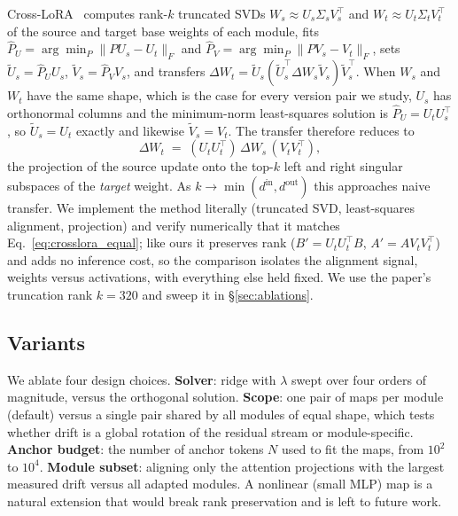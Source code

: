 Cross-LoRA~\citep{xia2025crosslora} computes rank-$k$ truncated SVDs
$W_s\approx U_s\Sigma_sV_s^\top$ and $W_t\approx U_t\Sigma_tV_t^\top$ of the
source and target base weights of each module, fits
$\hat P_U=\arg\min_P\lVert PU_s-U_t\rVert_F$ and
$\hat P_V=\arg\min_P\lVert PV_s-V_t\rVert_F$, sets $\tilde U_s=\hat P_UU_s$,
$\tilde V_s=\hat P_VV_s$, and transfers
$\Delta W_t=\tilde U_s(\tilde U_s^\top\Delta W_s\tilde V_s)\tilde V_s^\top$.
When $W_s$ and $W_t$ have the same shape, which is the case for every version
pair we study, $U_s$ has orthonormal columns and the minimum-norm least-squares
solution is $\hat P_U=U_tU_s^\top$, so $\tilde U_s=U_t$ exactly and likewise
$\tilde V_s=V_t$. The transfer therefore reduces to
\begin{equation}
  \Delta W_t \;=\; (U_tU_t^\top)\,\Delta W_s\,(V_tV_t^\top),
  \label{eq:crosslora_equal}
\end{equation}
the projection of the source update onto the top-$k$ left and right singular
subspaces of the \emph{target} weight. As $k\to\min(d^{\mathrm{in}},d^{\mathrm{out}})$
this approaches naive transfer. We implement the method literally (truncated
SVD, least-squares alignment, projection) and verify numerically that it
matches Eq.~\eqref{eq:crosslora_equal}; like ours it preserves rank
($B'=U_tU_t^\top B$, $A'=AV_tV_t^\top$) and adds no inference cost, so the
comparison isolates the alignment signal, weights versus activations, with
everything else held fixed. We use the paper's truncation rank $k=320$ and
sweep it in \S\ref{sec:ablations}.

\subsection{Variants}
\label{sec:method:variants}

We ablate four design choices. \textbf{Solver}: ridge with $\lambda$ swept
over four orders of magnitude, versus the orthogonal solution.
\textbf{Scope}: one pair of maps per module (default) versus a single pair
shared by all modules of equal shape, which tests whether drift is a global
rotation of the residual stream or module-specific. \textbf{Anchor budget}:
the number of anchor tokens $N$ used to fit the maps, from $10^2$ to $10^4$.
\textbf{Module subset}: aligning only the attention projections with the
largest measured drift versus all adapted modules. A nonlinear (small MLP)
map is a natural extension that would break rank preservation and is left to
future work.
